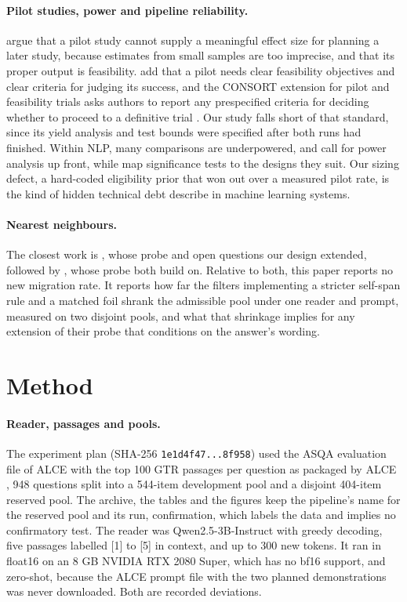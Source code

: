 \documentclass[11pt]{article}
\begin{document}
\paragraph{Pilot studies, power and pipeline reliability.} \citet{leon2011role} argue that a pilot study cannot supply a meaningful effect size for planning a later study, because estimates from small samples are too imprecise, and that its proper output is feasibility. \citet{thabane2010tutorial} add that a pilot needs clear feasibility objectives and clear criteria for judging its success, and the CONSORT extension for pilot and feasibility trials asks authors to report any prespecified criteria for deciding whether to proceed to a definitive trial \citep{eldridge2016consort}. Our study falls short of that standard, since its yield analysis and test bounds were specified after both runs had finished. Within NLP, many comparisons are underpowered, and \citet{card2020little} call for power analysis up front, while \citet{dror2018hitchhiker} map significance tests to the designs they suit. Our sizing defect, a hard-coded eligibility prior that won out over a measured pilot rate, is the kind of hidden technical debt \citet{sculley2015hidden} describe in machine learning systems.

\paragraph{Nearest neighbours.} The closest work is \citet{khan2026attributable}, whose probe and open questions our design extended, followed by \citet{wallat2025correctness}, whose probe both build on. Relative to both, this paper reports no new migration rate. It reports how far the filters implementing a stricter self-span rule and a matched foil shrank the admissible pool under one reader and prompt, measured on two disjoint pools, and what that shrinkage implies for any extension of their probe that conditions on the answer's wording.

\section{Method}\label{method}

\paragraph{Reader, passages and pools.} The experiment plan (SHA-256 \texttt{1e1d4f47...8f958}) used the ASQA evaluation file of ALCE with the top 100 GTR passages per question \citep{ni2022large} as packaged by ALCE \citep{gao2023enabling}, 948 questions split into a 544-item development pool and a disjoint 404-item reserved pool. The archive, the tables and the figures keep the pipeline's name for the reserved pool and its run, confirmation, which labels the data and implies no confirmatory test. The reader was Qwen2.5-3B-Instruct \citep{qwen2024qwen25} with greedy decoding, five passages labelled {[}1{]} to {[}5{]} in context, and up to 300 new tokens. It ran in float16 on an 8 GB NVIDIA RTX 2080 Super, which has no bf16 support, and zero-shot, because the ALCE prompt file with the two planned demonstrations was never downloaded. Both are recorded deviations.
\end{document}
